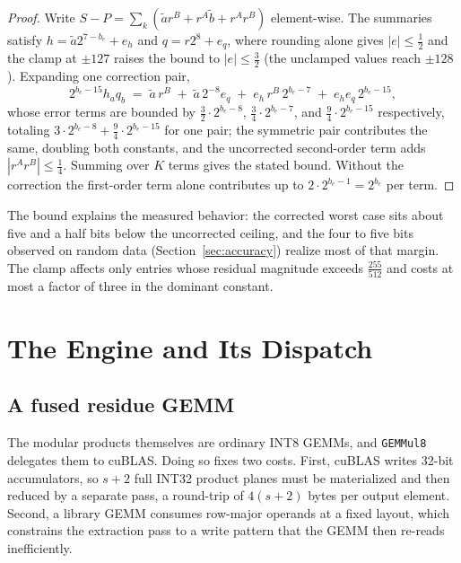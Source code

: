 \documentclass[11pt]{amsart}
\theoremstyle{plain}
\theoremstyle{definition}
\newcommand{\code}[1]{\texttt{#1}}
\newcommand{\gemmul}{\code{GEMMul8}}
\begin{document}
\begin{proof}
Write $S - P = \sum_k (\tilde{a} r^B + r^A \tilde{b} + r^A r^B)$
element-wise. The summaries satisfy $h = \tilde{a} 2^{7 - b_e} + e_h$ and
$q = r 2^{8} + e_q$, where rounding alone gives $|e| \le \tfrac12$ and
the clamp at $\pm 127$ raises the bound to $|e| \le \tfrac32$ (the
unclamped values reach $\pm 128$). Expanding one correction pair,
\[
  2^{b_e - 15} h_a q_b
  \;=\; \tilde{a}\, r^B
  \;+\; \tilde{a}\, 2^{-8} e_q
  \;+\; e_h\, r^B\, 2^{b_e - 7}
  \;+\; e_h e_q\, 2^{b_e - 15},
\]
whose error terms are bounded by $\tfrac32 \cdot 2^{b_e - 8}$,
$\tfrac34 \cdot 2^{b_e - 7}$, and $\tfrac94 \cdot 2^{b_e - 15}$
respectively, totaling $3 \cdot 2^{b_e-8} + \tfrac94 \cdot 2^{b_e-15}$
for one pair; the symmetric pair contributes the same, doubling both
constants, and the uncorrected second-order term adds
$|r^A r^B| \le \tfrac14$. Summing over $K$ terms gives the stated bound.
Without the correction the first-order term alone contributes up to
$2 \cdot 2^{b_e - 1} = 2^{b_e}$ per term.
\end{proof}

The bound explains the measured behavior: the corrected worst case sits
about five and a half bits below the uncorrected ceiling, and the four
to five bits observed on random data (Section~\ref{sec:accuracy})
realize most of that margin.
The clamp affects only entries whose residual magnitude exceeds
$\tfrac{255}{512}$ and costs at most a factor of three in the dominant
constant.

\section{The Engine and Its Dispatch}\label{sec:engine}

\subsection{A fused residue GEMM}

The modular products themselves are ordinary INT8 GEMMs, and \gemmul{}
delegates them to cuBLAS. Doing so fixes two costs.
First, cuBLAS writes 32-bit accumulators, so $s + 2$ full INT32 product
planes must be materialized and then reduced by a separate pass, a
round-trip of $4(s+2)$ bytes per output element. Second, a library GEMM
consumes row-major operands at a fixed layout, which constrains the
extraction pass to a write pattern that the GEMM then re-reads
inefficiently.
\end{document}
